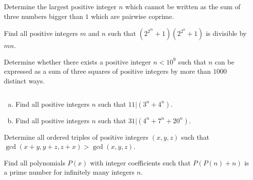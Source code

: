 \documentclass[problems.tex]{subfile}
\begin{document}
	
	
	\begin{problem}
		Determine the largest positive integer $n$ which cannot be written as the sum of three numbers bigger than $1$ which are pairwise coprime. %
	\end{problem}
	
	
	
	\begin{problem}
		Find all positive integers $m$ and $n$ such that $\left(2^{2^m}+1\right)\left(2^{2^n}+1\right)$ is divisible by $mn$.
	\end{problem}
	
	
	\begin{problem}
		Determine whether there exists a positive integer $n<10^9$ such that $n$ can be expressed as a sum of three squares of positive integers by more than $1000$ distinct ways.
	\end{problem}
	
	
	\begin{problem}
		$ $
		\begin{enumerate}[(a)]
			\item Find all positive integers $n$ such that $11|(3^n + 4^n)$.
			\item Find all positive integers $n$ such that $31|(4^n + 7^n + 20^n)$.
		\end{enumerate}
	\end{problem}
	
	
	
	\begin{problem}
		Determine all ordered triples of positive integers $(x, y, z)$ such that $\gcd(x+y, y+z, z+x) > \gcd(x, y, z)$. %
	\end{problem}
	
	
	
	
	\begin{problem}
		Find all polynomials $P(x)$ with integer coefficients such that $P(P(n) + n)$ is a prime number for infinitely many integers $n$. %
	\end{problem}
	
\end{document}
